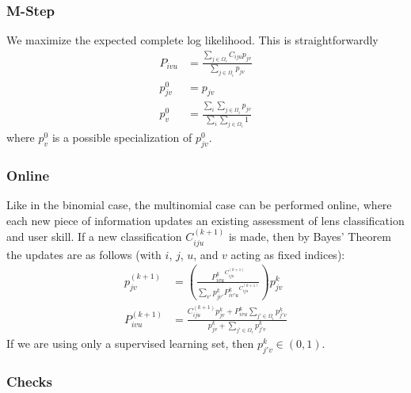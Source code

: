 \documentclass[useAMS,usenatbib,a4paper]{mn2e}
\begin{document}
\subsubsection{M-Step}

We maximize the expected complete log likelihood. This is straightforwardly
\begin{align}
  P_{ivu} &= \frac{\sum_{j \in \Omega_i} C_{iju} p_{jv}}{\sum_{j \in
\Omega_i} p_{jv}} \\
  p_{jv}^0 &= p_{jv} \\
  p_{v}^0 &= \frac{\sum_i \sum_{j \in \Omega_i} p_{jv}}{\sum_i \sum_{j \in
\Omega_i} 1}
\end{align}
where $p_{v}^0$ is a possible specialization of $p_{jv}^0$.

\subsubsection{Online}

Like in the binomial case, the multinomial case can be performed online, where
each new piece of information updates an existing assessment of lens
classification and user skill. If a new classification $C_{iju}^{(k + 1)}$ is
made, then by Bayes' Theorem the updates are as follows (with $i$, $j$, $u$,
and $v$ acting as fixed indices):
\begin{align}
  p_{jv}^{(k + 1)} &= \left( \frac{P^{k}_{ivu}^{C_{iju}^{(k + 1)}}}{\sum_{v'}
  p_{jv'}^{k} P^{k}_{iv'u}^{C_{iju}^{(k+1)}}} \right) p_{jv}^{k} \\
  P^{(k+1)}_{ivu}  &= \frac{C^{(k+1)}_{iju} p^{k}_{jv} + P^{k}_{ivu} \sum_{j'\in
  \Omega_i} p^{k}_{j'v} }{p^{k}_{jv} + \sum_{j'
  \in \Omega_i} p^{k}_{j'v}}
\end{align}
If we are using only a supervised learning set, then $p^k_{j'v} \in (0, 1)$.

\subsubsection{Checks}
\end{document}
